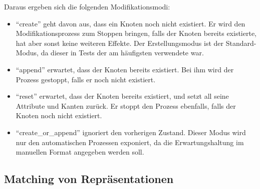 Daraus ergeben sich die folgenden Modifikationsmodi:

\begin{itemize}
    \itemsep0em
    \item \enquote{create} geht davon aus, dass ein Knoten noch nicht existiert.
    Er wird den Modifikationsprozess zum Stoppen bringen, falls der Knoten bereits existierte, hat aber sonst keine weiteren Effekte.
    Der Erstellungsmodus ist der Standard-Modus, da dieser in Tests der am häufigsten verwendete war.
    \item \enquote{append} erwartet, dass der Knoten bereits existiert.
    Bei ihm wird der Prozess gestoppt, falls er noch nicht existiert.
    \item \enquote{reset} erwartet, dass der Knoten bereits existiert, und setzt all seine Attribute und Kanten zurück.
    Er stoppt den Prozess ebenfalls, falls der Knoten noch nicht existiert.
    \item \enquote{create\_or\_append} ignoriert den vorherigen Zustand.
    Dieser Modus wird nur den automatischen Prozessen exponiert, da die Erwartungshaltung im manuellen Format angegeben werden soll.
\end{itemize}

\subsection{Matching von Repräsentationen}\label{subsec:model-matching}


